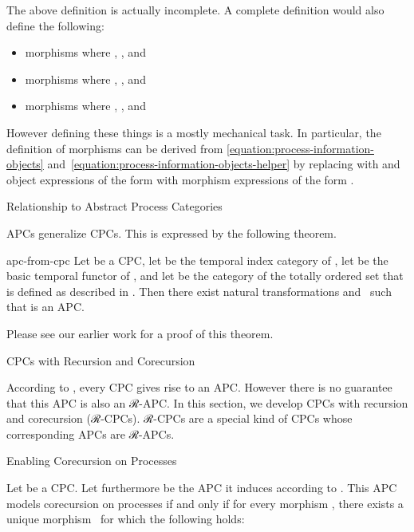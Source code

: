 \documentclass[copyright,creativecommons]{eptcs}
\begin{document}
The above definition is actually incomplete. A complete definition would also
define the following:
\begin{itemize}

\item

morphisms  where , , and 

\item

morphisms  where , , and 

\item

morphisms  where , , and 

\end{itemize}
However defining these things is a mostly mechanical task. In particular, the
definition of morphisms  can be derived from
\eqref{equation:process-information-objects}
and~\eqref{equation:process-information-objects-helper} by replacing  with
 and object expressions of the form  with morphism
expressions of the form .

              {Relationship to Abstract Process Categories}

APCs generalize CPCs. This is expressed by the following theorem.

\begin{exttheorem}{apc-from-cpc}
Let  be a CPC, let  be the temporal index category of ,
let  be the basic temporal functor of , and let  be the
category of the totally ordered set  that is defined as described in
. Then there exist natural
transformations  and~ such that  is an
APC.
\end{exttheorem}

Please see our earlier work \cite[proof of Theorem~10]{jeltsch:plpv-2014} for a
proof of this theorem.

           {CPCs with Recursion and Corecursion}


According to , every CPC gives rise to an APC. However
there is no guarantee that this APC is also an ℛ-APC. In this section, we
develop CPCs with recursion and corecursion (ℛ-CPCs). ℛ-CPCs are a special kind
of CPCs whose corresponding APCs are ℛ-APCs.

              {Enabling Corecursion on Processes}

Let  be a CPC. Let furthermore  be
the APC it induces according to . This APC models
corecursion on processes if and only if for every morphism , there exists a unique morphism~ for which the
following holds:
\end{document}
